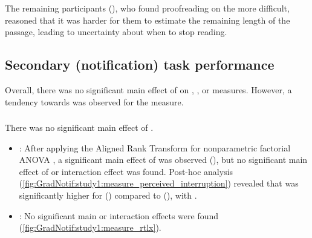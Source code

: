 The remaining participants (), who found proofreading on the \glass{} more difficult, reasoned that it was harder for them to estimate the remaining length of the passage, leading to uncertainty about when to stop reading.



\subsection{Secondary (notification) task performance}
\label{sec:GradNotif:study1:results_secondary_task}

Overall, there was no significant main effect of \animation{} on \Interruption{}, \Reaction{}, or \Comprehension{} measures. However, a tendency towards \fading{} \animation{} was observed for the \Satisfaction{} measure.

\subsubsection*{\Interruption{}}
There was no significant main effect of \animation{}. 

\begin{itemize}
    \item \perceivedInterruption{}: After applying the Aligned Rank Transform for nonparametric factorial ANOVA \cite{wobbrock_aligned_2011}, a significant main effect of \location{} was observed (), but no significant main effect of \animation{} or interaction effect was found. Post-hoc analysis (\autoref{fig:GradNotif:study1:measure_perceived_interruption}) revealed that \perceivedInterruption{} was significantly higher for \desktop{} () compared to \glass{} (), with .
    \item \perceivedTaskLoad{}: No significant main or interaction effects were found (\autoref{fig:GradNotif:study1:measure_rtlx}).
\end{itemize}


